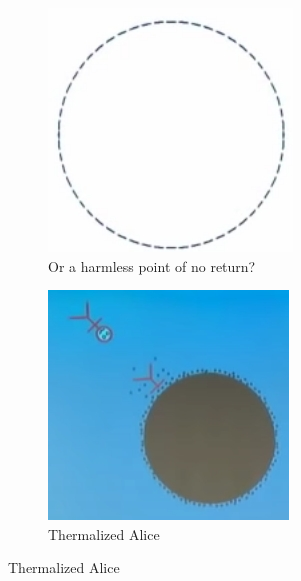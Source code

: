\documentclass[]{article}
\begin{document}
\begin{figure}[H]
\begin{center}
\begin{subfigure}[t]{0.2\textwidth}
		\end{subfigure}
		\;
		\begin{subfigure}[t]{0.2\textwidth}
			\caption{Or a harmless point of no return?}
			\includegraphics[width=\textwidth]{wh-or-harmless}
		\end{subfigure}
		\begin{subfigure}[t]{0.2\textwidth}
			\caption{Thermalized Alice}
			\includegraphics[width=\textwidth]{wh-thermal-alice}
		\end{subfigure}
	\end{center}
\end{figure}
\end{document}
